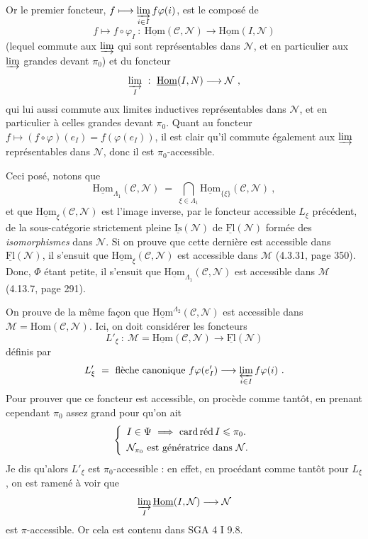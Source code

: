 \documentclass[11pt]{article}
\newcommand{\printedpage}[1]{\marginpar{\footnotesize p.~#1}}
\newcommand{\msp}[1]{\marginpar{\footnotesize [#1]}}
\newcommand{\uHom}{\underline{\mathrm{Hom}}}
\newcommand{\uFl}{\underline{\mathrm{Fl}}}
\newcommand{\uIs}{\underline{\mathrm{Is}}}
\newcommand{\cardred}{\mathop{\textup{card\,réd}}}
\begin{document}
\msp{page 382}
Or le premier foncteur, $f \longmapsto \varinjlim\limits_{i\in I} f\varphi(i)$, est le composé de
\[
f \longmapsto f\circ\varphi_I \ : \ \uHom(\mathcal{C},\mathcal{N}) \longrightarrow \uHom(I,\mathcal{N})
\]
(lequel commute aux $\varinjlim$ qui sont représentables dans $\mathcal{N}$, et en particulier aux $\varinjlim$ grandes devant $\pi_0$) et du foncteur
\[
\varinjlim_{I} \ : \ \uHom(I,N) \longrightarrow \mathcal{N} \ , %
\]
qui lui aussi commute aux limites inductives représentables dans $\mathcal{N}$, et en particulier à celles grandes devant $\pi_0$. Quant au foncteur $f \longmapsto (f\circ\varphi)(e_I) = f(\varphi(e_I))$, il est clair qu'il commute également aux $\varinjlim$ représentables dans $\mathcal{N}$, donc il est $\pi_0$-accessible.

\printedpage{145}

Ceci posé, notons que
\[
\uHom_{\Lambda_1}(\mathcal{C},\mathcal{N}) \ = \ \bigcap_{\xi\in\Lambda_1} \uHom_{\{\xi\}}(\mathcal{C},\mathcal{N}) \ ,
\]
et que $\uHom_\xi(\mathcal{C},\mathcal{N})$ est l'image inverse, par le foncteur accessible $L_\xi$ précédent, de la sous-catégorie strictement pleine $\uIs(\mathcal{N})$ de $\uFl(\mathcal{N})$ formée des \textit{isomorphismes} dans $\mathcal{N}$. Si on prouve que cette dernière est accessible dans $\uFl(\mathcal{N})$, il s'ensuit que
\msp{page 383}
$\uHom_\xi(\mathcal{C},\mathcal{N})$ est accessible dans $\mathcal{M}$ (4.3.31, page 350). Donc, $\Phi$ étant petite, il s'ensuit que $\uHom_{\Lambda_1}(\mathcal{C},\mathcal{N})$ est accessible dans $\mathcal{M}$ (4.13.7, page 291).

On prouve de la même façon que $\uHom^{\Lambda_2}(\mathcal{C},\mathcal{N})$ est accessible dans $\mathcal{M} = \mathrm{Hom}(\mathcal{C},\mathcal{N})$. Ici, on doit considérer les foncteurs %
\[
L'_\xi \ : \ \mathcal{M} = \uHom(\mathcal{C},\mathcal{N}) \longrightarrow \uFl(\mathcal{N})
\]
définis par
\[
L'_\xi \ = \ \text{flèche canonique } f\varphi(e'_I) \longrightarrow \varprojlim_{i\in I} f\varphi(i) \ .
\]
Pour prouver que ce foncteur est accessible, on procède comme tantôt, en prenant cependant $\pi_0$ assez grand pour qu'on ait
\[
\left\{
\begin{array}{l}
I \in \Psi \ \Longrightarrow \ \cardred I \leqslant \pi_0. \\[1ex]
\mathcal{N}_{\pi_0} \text{ est génératrice dans } \mathcal{N}.
\end{array}
\right.
\]
Je dis qu'alors $L'_\xi$ est $\pi_0$-accessible : en effet, en procédant comme tantôt pour $L_\xi$, on est ramené à voir que
\[
\varinjlim_{I} \uHom(I,\mathcal{N}) \longrightarrow \mathcal{N}
\]
est $\pi$-accessible. Or cela est contenu dans SGA 4 I 9.8.
\end{document}
